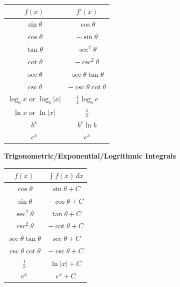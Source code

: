 \documentclass[12pt]{exam}
\newcommand{\ds}{\ensuremath{\displaystyle}}
\newcommand{\<}{\langle}
\renewcommand{\>}{\rangle}
\begin{document}
\begin{center}
\begin{tabular}{c|c}
  \(f(x)\) & \(f'(x)\) \\\hline
  \(\sin\theta\) & \(\cos\theta\) \\
  \(\cos\theta\) & \(-\sin\theta\) \\
  \(\tan\theta\) & \(\sec^2\theta\) \\
  \(\cot\theta\) & \(-\csc^2\theta\) \\
  \(\sec\theta\) & \(\sec\theta\tan\theta\) \\
  \(\csc\theta\) & \(-\csc\theta\cot\theta\) \\
  \(\log_b x\) or \(\log_b|x|\) & \(\frac{1}{x}\log_b e\) \\
  \(\ln x\) or \(\ln|x|\) & \(\frac{1}{x}\) \\
  \(b^x\) & \(b^x\ln b\) \\
  \(e^x\) & \(e^x\)
\end{tabular}
\end{center}

\noindent
\textbf{Trigonometric/Exponential/Logrithmic Integrals}

\begin{center}
\begin{tabular}{c|c}
  \(f(x)\) & \(\int f(x)\,dx\) \\\hline
  \(\cos\theta\) & \(\sin\theta+C\) \\
  \(\sin\theta\) & \(-\cos\theta+C\) \\
  \(\sec^2\theta\) & \(\tan\theta+C\) \\
  \(\csc^2\theta\) & \(-\cot\theta+C\) \\
  \(\sec\theta\tan\theta\) & \(\sec\theta+C\) \\
  \(\csc\theta\cot\theta\) & \(-\csc\theta+C\) \\
  \(\frac{1}{x}\) & \(\ln|x|+C\) \\
  \(e^x\) & \(e^x+C\)
\end{tabular}
\end{center}




\end{document}
